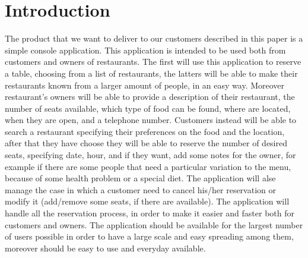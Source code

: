 \chapter{Introduction}
The product that we want to deliver to our customers described in this paper is
a simple console application. This application is intended to be used
both from customers and owners of restaurants. The first will use this
application to
reserve a table, choosing from a list of restaurants, the latters will be able to
make their restaurants known from a larger amount of people, in an easy way.
Moreover restaurant's owners will be able to provide a description of their
restaurant, the number of seats available, which type of food can be found, where
are located, when they are open, and a telephone number.
Customers instead will be able to search a restaurant specifying their
preferences on the food and the location, after that they have choose they will 
be able to reserve the number of desired seats, specifying  date, hour, and if 
they want, add some notes for the owner, for example if there are some people 
that need a particular variation to the menu, because of some health problem or a
special diet. The application will alse manage the case in which a customer need
to cancel his/her reservation or modify it (add/remove some seats, if there are
available).
The application will handle all the reservation process, in order to make it
easier and faster both for customers and owners. The application should be
available for the largest number of users possible in order to have a large
scale and easy spreading among them, moreover should be easy to use and everyday
available.
